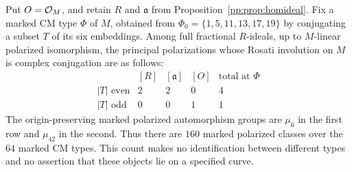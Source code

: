 \begin{proposition}
\label{pp:prop:markedpolarizations}
Put $O=\mathcal O_M$, and retain $R$ and $\mathfrak a$ from
Proposition~\ref{pp:prop:homideal}. Fix a marked CM type $\Phi$ of $M$,
obtained from $\Phi_0=\{1,5,11,13,17,19\}$ by conjugating a subset
$T$ of its six embeddings. Among full fractional $R$-ideals, up to
$M$-linear polarized isomorphism, the principal polarizations whose
Rosati involution on $M$ is complex conjugation are as follows:
\[
\begin{array}{c|ccc|c}
 & [R]&[\mathfrak a]&[O]&\text{total at }\Phi\\ \hline
|T|\text{ even}&2&2&0&4\\
|T|\text{ odd}&0&0&1&1
\end{array}
\]
The origin-preserving marked polarized automorphism groups are
$\mu_6$ in the first row and $\mu_{42}$ in the second. Thus there
are $160$ marked polarized classes over the $64$ marked CM types.
This count makes no identification between different types and no
assertion that these objects lie on a specified curve.
\end{proposition}
